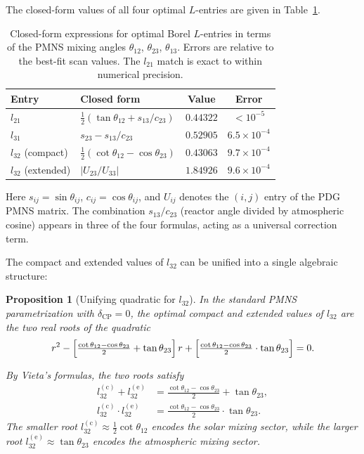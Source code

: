 \documentclass[11pt,a4paper]{article}
\newtheorem{proposition}{Proposition}
\begin{document}
The closed-form values of all four optimal $L$-entries are
given in Table~\ref{tab:closed_form}.
 
\begin{table}[h]
\centering
\caption{Closed-form expressions for optimal Borel $L$-entries
in terms of the PMNS mixing angles
$\theta_{12}$, $\theta_{23}$, $\theta_{13}$.
Errors are relative to the best-fit scan values.
The $l_{21}$ match is exact to within numerical precision.}
\label{tab:closed_form}
\begin{tabular}{llcc}
\toprule
Entry & Closed form & Value & Error \\
\midrule
$l_{21}$          & $\tfrac{1}{2}(\tan\theta_{12} + s_{13}/c_{23})$
                  & $0.44322$ & $<10^{-5}$ \\
$l_{31}$          & $s_{23} - s_{13}/c_{23}$
                  & $0.52905$ & $6.5\times10^{-4}$ \\
$l_{32}$ (compact)  & $\tfrac{1}{2}(\cot\theta_{12} - \cos\theta_{23})$
                  & $0.43063$ & $9.7\times10^{-4}$ \\
$l_{32}$ (extended) & $|U_{23}/U_{33}|$
                  & $1.84926$ & $9.6\times10^{-4}$ \\
\bottomrule
\end{tabular}
\end{table}
 
\noindent
Here $s_{ij} = \sin\theta_{ij}$, $c_{ij} = \cos\theta_{ij}$,
and $U_{ij}$ denotes the $(i,j)$ entry of the PDG PMNS matrix.
The combination $s_{13}/c_{23}$ (reactor angle divided by
atmospheric cosine) appears in three of the four formulas,
acting as a universal correction term.
 
The compact and extended values of $l_{32}$ can be unified into a
single algebraic structure:
 
\begin{proposition}[Unifying quadratic for $l_{32}$]
\label{prop:quadratic}
In the standard PMNS parametrization with $\delta_{\mathrm{CP}} = 0$,
the optimal compact and extended values of $l_{32}$ are the two
real roots of the quadratic
\begin{equation}
\label{eq:quadratic}
r^2 - \Bigl[\tfrac{\cot\theta_{12} - \cos\theta_{23}}{2}
            + \tan\theta_{23}\Bigr]\,r
     + \Bigl[\tfrac{\cot\theta_{12} - \cos\theta_{23}}{2}
             \cdot \tan\theta_{23}\Bigr] = 0.
\end{equation}

By Vieta's formulas, the two roots satisfy
\begin{align}
l_{32}^{(\mathrm{c})} + l_{32}^{(\mathrm{e})}
  &= \tfrac{\cot\theta_{12} - \cos\theta_{23}}{2} + \tan\theta_{23},
  \label{eq:vieta_sum}\\
l_{32}^{(\mathrm{c})} \cdot l_{32}^{(\mathrm{e})}
  &= \tfrac{\cot\theta_{12} - \cos\theta_{23}}{2} \cdot \tan\theta_{23}.
  \label{eq:vieta_product}
\end{align}
The smaller root $l_{32}^{(\mathrm{c})} \approx \tfrac{1}{2}\cot\theta_{12}$
encodes the \emph{solar} mixing sector, while the larger root
$l_{32}^{(\mathrm{e})} \approx \tan\theta_{23}$ encodes the
\emph{atmospheric} mixing sector.
\end{proposition}
 
\end{document}
